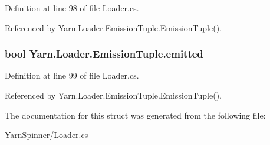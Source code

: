 Definition at line 98 of file Loader.\-cs.



Referenced by Yarn.\-Loader.\-Emission\-Tuple.\-Emission\-Tuple().

\hypertarget{a00097_a5916dbbd4d2e24ddfd02b0afdea290bf}{
\subsubsection[{emitted}]{\setlength{\rightskip}{0pt plus 5cm}bool Yarn.\-Loader.\-Emission\-Tuple.\-emitted}}\label{a00097_a5916dbbd4d2e24ddfd02b0afdea290bf}


Definition at line 99 of file Loader.\-cs.



Referenced by Yarn.\-Loader.\-Emission\-Tuple.\-Emission\-Tuple().



The documentation for this struct was generated from the following file\-:\begin{DoxyCompactItemize}
\item 
Yarn\-Spinner/\hyperlink{a00312}{Loader.\-cs}\end{DoxyCompactItemize}
